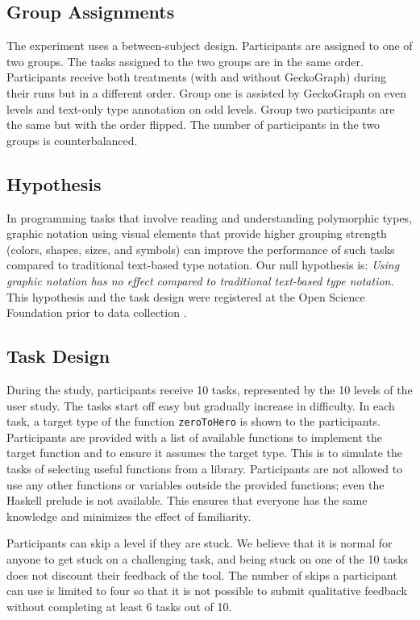 \documentclass[preprint,12pt]{elsarticle}
\begin{document}
\subsection{Group Assignments}

The experiment uses a between-subject design. Participants are assigned to one of two groups. The tasks assigned to the two groups are in the same order. Participants receive both treatments (with and without GeckoGraph) during their runs but in a different order.   Group one is assisted by GeckoGraph on even levels and text-only type annotation on odd levels. Group two participants are the same but with the order flipped. The number of participants in the two groups is counterbalanced.

\subsection{Hypothesis}
In programming tasks that involve reading and understanding polymorphic types, graphic notation using visual elements that provide higher grouping strength (colors, shapes, sizes, and symbols) can improve the performance of such tasks compared to traditional text-based type notation. Our null hypothesis is: {\it Using graphic notation has no effect compared to traditional text-based type notation.} This hypothesis and the task design were registered at the Open Science Foundation prior to data collection \cite{Stuckey2023-vl}. 

\subsection{Task Design} \label{subsection:task}
During the study, participants receive 10 tasks, represented by the 10 levels of the user study. The tasks start off easy but gradually increase in difficulty.  In each task, a target type of the function \texttt{zeroToHero} is shown to the participants. Participants are provided with a list of available functions to implement the target function and to ensure it assumes the target type. This is to simulate the tasks of selecting useful functions from a library. Participants are not allowed to use any other functions or variables outside the provided functions; even the Haskell prelude is not available. This ensures that everyone has the same knowledge and minimizes the effect of familiarity. 

Participants can skip a level if they are stuck. We believe that it is normal for anyone to get stuck on a challenging task, and being stuck on one of the 10 tasks does not discount their feedback of the tool. The number of skips a participant can use is limited to four so that it is not possible to submit qualitative feedback without completing at least 6 tasks out of 10. 
\end{document}
